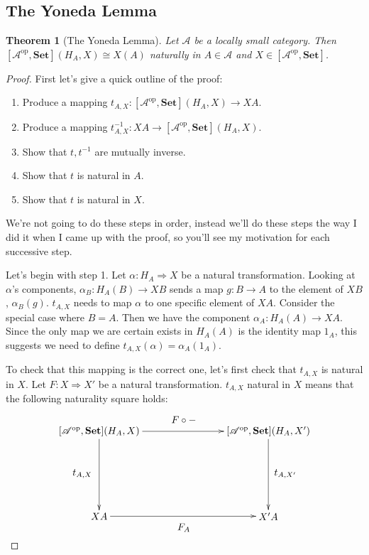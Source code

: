 \documentclass[11pt]{article}
\theoremstyle{definition}
\theoremstyle{definition}
\theoremstyle{plain}
\newtheorem{theo}{Theorem}
\theoremstyle{plain}
\theoremstyle{plain}
\begin{document}
\subsection*{The Yoneda Lemma}

\begin{theo}[The Yoneda Lemma]
Let $\mathscr{A}$ be a locally small category. Then $[\mathscr{A}^{\text{op}}, \textbf{Set}](H_A,X) \cong X(A)$ naturally in $A \in \mathscr{A}$ and $X \in [\mathscr{A}^{\text{op}}, \textbf{Set}]$.
\end{theo}

\begin{proof}
First let's give a quick outline of the proof:
\begin{enumerate}
\item Produce a mapping $t_{A,X}: [\mathscr{A}^{\text{op}}, \textbf{Set}](H_A, X) \to XA$.
\item Produce a mapping $t^{-1}_{A,X}: XA \to [\mathscr{A}^{\text{op}}, \textbf{Set}](H_A,X)$.
\item Show that $t,t^{-1}$ are mutually inverse.
\item Show that $t$ is natural in $A$.
\item Show that $t$ is natural in $X$.
\end{enumerate}

We're not going to do these steps in order, instead we'll do these steps the way I did it when I came up with the proof, so you'll see my motivation for each successive step.

Let's begin with step 1. Let $\alpha:H_A \Rightarrow X$ be a natural transformation. Looking at $\alpha$'s components, $\alpha_B:H_A(B) \to XB$ sends a map $g:B \to A$ to the element of $XB$, $\alpha_B(g)$. $t_{A,X}$ needs to map $\alpha$ to one specific element of $XA$. Consider the special case where $B=A$. Then we have the component $\alpha_A:H_A(A) \to XA$. Since the only map we are certain exists in $H_A(A)$ is the identity map $1_A$, this suggests we need to define $t_{A,X}(\alpha) = \alpha_A(1_A)$.

To check that this mapping is the correct one, let's first check that $t_{A,X}$ is natural in $X$. Let $F:X \Rightarrow X'$ be a natural transformation. $t_{A,X}$ natural in $X$ means that the following naturality square holds:

\begin{equation*}
\begin{xy}
(0,0)*+{[\mathscr{A}^{\text{op}},\textbf{Set}](H_A,X)}="v1"; (60,0)*+{[\mathscr{A}^{\text{op}},\textbf{Set}](H_A,X')}="v2"; (0,-30)*+{XA}="v3"; (60,-30)*+{X'A}="v4";
{\ar "v1";"v2"}?*!/_4mm/{F \circ -};
{\ar "v1";"v3"}?*!/^6mm/{t_{A,X}};
{\ar "v2";"v4"}?*!/_6mm/{t_{A,X'}};
{\ar "v3";"v4"}?*!/^4mm/{F_A};
\end{xy}
\end{equation*}


\end{proof}
\end{document}
